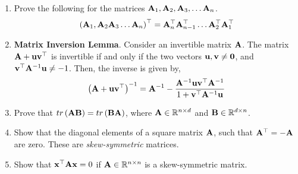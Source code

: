 \documentclass[
10pt, %
a4paper, %
oneside, %
headinclude,footinclude, %
BCOR5mm, %
]{scrartcl}
\def\mf{\ensuremath\mathbf}
\def\mb{\ensuremath\mathbb}
\def\lp{\ensuremath\left(}
\def\rp{\ensuremath\right)}
\begin{document}
\begin{enumerate}
	\item Prove the following for the matrices $\mf{A}_1, \mf{A}_2, \mf{A}_3, \ldots \mf{A}_n$.
	\[ \lp \mf{A}_1, \mf{A}_2 \mf{A}_3 \ldots \mf{A}_n \rp^\top =  \mf{A}_n^\top \mf{A}_{n-1}^\top \ldots \mf{A}_2^\top \mf{A}_1^\top \]


	\item \textbf{Matrix Inversion Lemma}. Consider an invertible matrix $\mf{A}$. The matrix $\mf{A} + \mf{u}\mf{v}^\top$ is invertible if and only if the two vectors $\mf{u}, \mf{v} \neq \mf{0}$, and $\mf{v}^\top\mf{A}^{-1}\mf{u} \neq -1$. Then, the inverse is given by,
	\[ \lp \mf{A} + \mf{u}\mf{v}^\top\rp^{-1} = \mf{A}^{-1} - \frac{\mf{A}^{-1}\mf{u}\mf{v}^\top\mf{A}^{-1}}{1 + \mf{v}^{\top}\mf{A}^{-1}\mf{u}} \]

	\item Prove that $tr\lp \mf{A}\mf{B} \rp = tr\lp \mf{B}\mf{A} \rp$, where $\mf{A} \in \mb{R}^{n \times d}$ and $\mf{B} \in \mb{R}^{d \times n}$.
	
	\item Show that the diagonal elements of a square matrix $\mf{A}$, such that $\mf{A}^\top = -\mf{A}$ are zero. These are \textit{skew-symmetric} matrices.
	
	\item Show that $\mf{x}^\top\mf{A}\mf{x} = 0$ if $\mf{A} \in \mb{R}^{n \times n}$ is a skew-symmetric matrix.
\end{enumerate}
\end{document}
